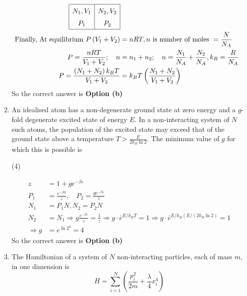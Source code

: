 \begin{enumerate}
\begin{answer}
	\begin{align*}
	\renewcommand*{\arraystretch}{1.5}
	\begin{array}{|c|c|}
	\hline N_{1}, V_{1} & N_{2}, V_{2} \\
	P_{1} & P_{2} \\
	\hline
	\end{array}\\
\text{	Finally, At equilibrium }P\left(V_{1}+V_{2}\right)&=n R T, n\text{ is number of moles }=\frac{N}{N_{A}}\\
	P=\frac{n R T}{V_{1}+V_{2}} ; \quad n&=n_{1}+n_{2} ; \quad n=\frac{N_{1}}{N_{A}}+\frac{N_{2}}{N_{A}}, k_{B}=\frac{R}{N_{A}} \\
	P=\frac{\left(N_{1}+N_{2}\right) k_{B} T}{V_{1}+V_{2}}&=k_{B} T\left(\frac{N_{1}+N_{2}}{V_{1}+V_{2}}\right)
	\end{align*}
		So the correct answer is \textbf{Option (b)}
\end{answer}
\item An idealised atom has a non-degenerate ground state at zero energy and a $g$-fold degenerate excited state of energy $E$. In a non-interacting system of $N$ such atoms, the population of the excited state may exceed that of the ground state above a temperature $T>\frac{E}{2 k_{B} \ln 2}$. The minimum value of $g$ for which this is possible is
 \begin{tasks}(4)
\end{tasks}
\begin{answer}
	\begin{align*}
	z&=1+g e^{-\beta \varepsilon} \\
	P_{1}&=\frac{e^{-\beta 0}}{z}, \quad P_{2}=\frac{g e^{-\beta \varepsilon}}{z} \\
	N_{1}&=P_{1} N, N_{2}=P_{2} N \\
	N_{2}&=N_{1} \Rightarrow g \frac{e^{-\beta \varepsilon}}{z}=\frac{1}{z} \Rightarrow g \cdot \bar{e}^{E / k_{B} T}=1 \Rightarrow g \cdot \bar{e}^{E / k_{B}\left(E /\left(2 k_{B} \ln 2\right)\right.}=1 \\
	\Rightarrow g&=e^{\ln 2^{2}}=4
	\end{align*}
		So the correct answer is \textbf{Option (b)}
\end{answer}
\item  The Hamiltonian of a system of $N$ non-interacting particles, each of mass $m$, in one dimension is
$$
H=\sum_{i=1}^{N}\left(\frac{p_{i}^{2}}{2 m}+\frac{\lambda}{4} x_{i}^{4}\right)
$$
\end{enumerate}
